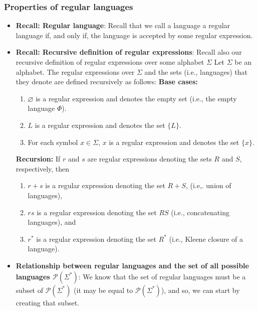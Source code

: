 \documentclass{report}
\begin{document}
    \pagebreak 
    \subsubsection{Properties of regular languages}
    \begin{itemize}
        \item \textbf{Recall: Regular language}: Recall that we call a language a regular language if, and only if, the language is accepted by some regular expression. 
        \item \textbf{Recall: Recursive definition of regular expressions}: Recall also our recursive definition of regular expressions over some alphabet $\Sigma $
            \bigbreak \noindent 
            Let $\Sigma$ be an alphabet. The regular expressions over $\Sigma$ and the sets (i.e., languages) that they denote are defined recursively as follows:
            \bigbreak \noindent 
            \textbf{Base cases:}
            \begin{enumerate}
                \item $\varnothing$ is a regular expression and denotes the empty set (i.e., the empty language $\Phi$).
                \item $L$ is a regular expression and denotes the set $\{L\}$.
                \item For each symbol $x\in \Sigma$, $x$ is a regular expression and denotes the set $\{x\}$.
            \end{enumerate}
            \bigbreak \noindent 
            \textbf{Recursion:} If $r$ and $s$ are regular expressions denoting the sets $R$ and $S$, respectively, then
            \begin{enumerate}
                \item $r+s$ is a regular expression denoting the set $R + S$, (i.e,. union of languages),
                \item $rs$ is a regular expression denoting the set $RS$ (i.e., concatenating languages), and
                \item $r^{*}$ is a regular expression denoting the set $R^{*}$ (i.e., Kleene closure of a language).
            \end{enumerate}
        \item \textbf{Relationship between regular languages and the set of all possible languages $\mathcal{P}(\Sigma^{*})$}:
            We know that the set of regular languages must be a subset of $\mathcal{P}(\Sigma^{*})$ (it may be equal to $\mathcal{P}(\Sigma^{*})$), and so, we can start by creating that subset.

\end{itemize}
\end{document}
